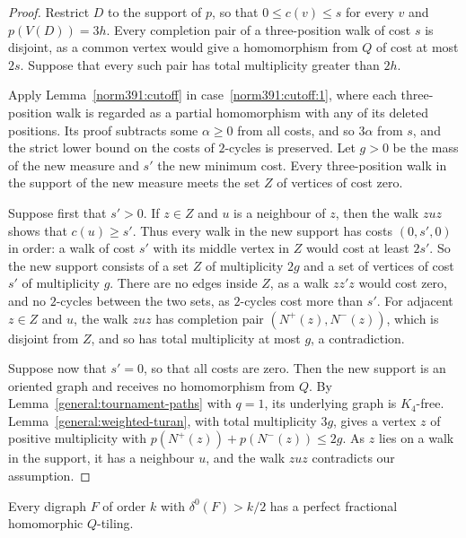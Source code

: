 \begin{proof}
Restrict $D$ to the support of $p$, so that $0\le c(v)\le s$ for every $v$ and $p(V(D))=3h$.
Every completion pair of a three-position walk of cost $s$ is disjoint, as a common
vertex would give a homomorphism from $Q$ of cost at most $2s$.
Suppose that every such pair has total multiplicity greater than $2h$.

Apply Lemma~\ref{norm391:cutoff} in case~\ref{norm391:cutoff:1}, where each three-position walk is regarded as a partial homomorphism with any of its deleted positions. Its proof subtracts some $\alpha\ge0$ from all costs, and so $3\alpha$ from $s$, and the strict lower bound on the costs of $2$-cycles is preserved. Let $g>0$ be the mass of the new measure and $s'$ the new minimum cost.
Every three-position walk in the support of the new measure meets the set $Z$ of vertices of cost zero.

Suppose first that $s'>0$. If $z\in Z$ and $u$ is a neighbour of $z$, then the walk $zuz$ shows that $c(u)\ge s'$. Thus every walk in the new support has costs $(0,s',0)$ in order: a walk of cost $s'$ with its middle vertex in $Z$ would cost at least $2s'$.
So the new support consists of a set $Z$ of multiplicity $2g$ and a set of vertices of cost $s'$ of multiplicity $g$. There are no edges inside $Z$, as a walk $zz'z$ would cost zero, and no $2$-cycles between the two sets, as $2$-cycles cost more than $s'$.
For adjacent $z\in Z$ and $u$, the walk $zuz$ has completion pair $(N^+(z),N^-(z))$, which is disjoint from $Z$, and so has total multiplicity at most $g$, a contradiction.

Suppose now that $s'=0$, so that all costs are zero. Then the new support is an oriented graph and receives no homomorphism from $Q$.
By Lemma~\ref{general:tournament-paths} with $q=1$, its underlying graph is $K_4$-free.
Lemma~\ref{general:weighted-turan}, with total multiplicity $3g$, gives
a vertex $z$ of positive multiplicity with
$p(N^+(z))+p(N^-(z))\le2g$.
As $z$ lies on a walk in the support, it has a neighbour $u$, and the walk $zuz$ contradicts our assumption.
\end{proof}

\begin{theorem}\label{q:fractional}
Every digraph $F$ of order $k$ with $\delta^0(F)>k/2$ has a perfect
fractional homomorphic $Q$-tiling.
\end{theorem}

